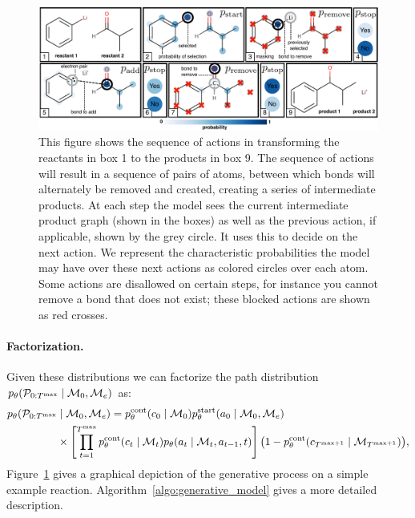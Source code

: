 \begin{figure}
\centering
\includegraphics[width=\textwidth]{reaction_model_blue}
\caption{
 This figure shows the sequence of actions in transforming the reactants in box 1 to the products in box 9.
 The sequence of actions will result in a sequence of pairs of atoms, between which bonds will alternately be removed and created, creating a series of intermediate products. 
At each step the model sees the current intermediate product graph (shown in the boxes) as well as the previous action, if applicable, shown by the grey circle. It uses this to decide on the next action.
We represent the characteristic probabilities the model may have over these next actions as colored circles over each atom.
Some actions are disallowed on certain steps, for instance you cannot remove a bond that does not exist; these blocked actions are shown as red crosses.
}
\label{fig:reaction_model}
\end{figure}







\paragraph{Factorization.}
Given these distributions we can factorize the path distribution $p_\theta( {\mathcal{P}}_{0:T^{\mathrm{max}}} \mid {\mathcal{M}}_0, {\mathcal{M}}_e)$ as:
\begin{align}
\label{eq:jointprob}
p_\theta({\mathcal{P}}_{0:T^{\mathrm{max}}} &\mid {\mathcal{M}}_0, {\mathcal{M}}_e) 
=
	p_\theta^\textrm{cont}(c_0 \mid {\mathcal{M}}_0)
	p_\theta^{\mathrm{start}}(a_0 \mid {\mathcal{M}}_0, {\mathcal{M}}_e)\\ \nonumber 
	& \times
	\left[\prod_{t=1}^{T^{\mathrm{max}}}
		p_\theta^{\mathrm{cont}}(c_{t} \mid {\mathcal{M}}_{t})
		p_\theta(a_t \mid {\mathcal{M}}_{t}, a_{t-1}, t)
	\right]
	\big(1- p_\theta^{\mathrm{cont}}(c_{T^{\mathrm{max}+1}} \mid {\mathcal{M}}_{T^{\mathrm{max}+1}})\big)
	,
\end{align}
Figure~\ref{fig:reaction_model} gives a graphical depiction of the generative process on a simple example reaction. Algorithm~\ref{algo:generative_model} gives a more detailed description.

